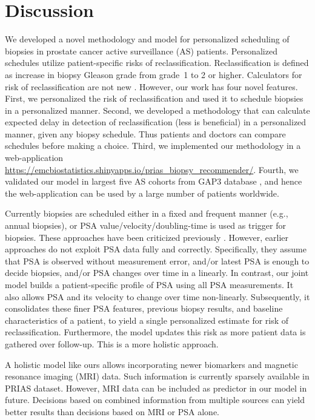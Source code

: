 \section{Discussion}
We developed a novel methodology and model for personalized scheduling of biopsies in prostate cancer active surveillance (AS) patients. Personalized schedules utilize patient-specific risks of reclassification. Reclassification is defined as increase in biopsy Gleason grade \citep{epsteinGG2014} from grade~1 to 2 or higher. Calculators for risk of reclassification are not new \citep{coley2017prediction,ankerst2015precision}. However, our work has four novel features. First, we personalized the risk of reclassification and used it to schedule biopsies in a personalized manner. Second, we developed a methodology that can calculate expected delay in detection of reclassification (less is beneficial) in a personalized manner, given any biopsy schedule. Thus patients and doctors can compare schedules before making a choice. Third, we implemented our methodology in a web-application \url{https://emcbiostatistics.shinyapps.io/prias_biopsy_recommender/}. Fourth, we validated our model in largest five AS cohorts from GAP3 database \citep{gap3_2018}, and hence the web-application can be used by a large number of patients worldwide.

Currently biopsies are scheduled either in a fixed and frequent manner (e.g., annual biopsies), or PSA value/velocity/doubling-time is used as trigger for biopsies. These approaches have been criticized previously \citep{vickers2009psavelocity,bokhorst2015compliance}. However, earlier approaches do not exploit PSA data fully and correctly. Specifically, they assume that PSA is observed without measurement error, and/or latest PSA is enough to decide biopsies, and/or PSA changes over time in a linearly. In contrast, our joint model builds a patient-specific profile of PSA using all PSA measurements. It also allows PSA and its velocity to change over time non-linearly. Subsequently, it consolidates these finer PSA features, previous biopsy results, and baseline characteristics of a patient, to yield a single personalized estimate for risk of reclassification. Furthermore, the model updates this risk as more patient data is gathered over follow-up. This is a more holistic approach.

A holistic model like ours allows incorporating newer biomarkers and magnetic resonance imaging (MRI) data. Such information is currently sparsely available in PRIAS dataset. However, MRI data can be included as predictor in our model in future. Decisions based on combined information from multiple sources can yield better results than decisions based on MRI or PSA alone. 

